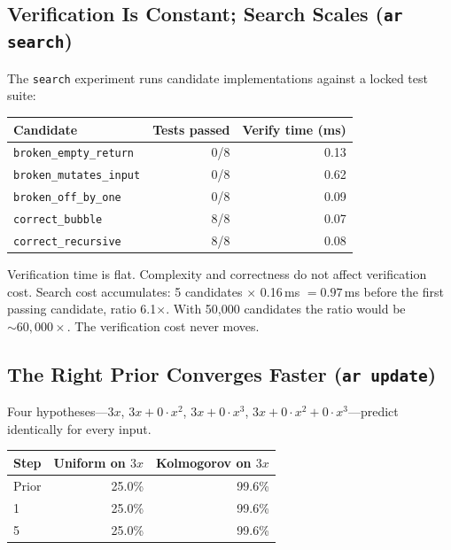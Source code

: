 \subsection{Verification Is Constant; Search Scales (\texttt{ar search})}

The \texttt{search} experiment runs candidate implementations against a
locked test suite:

\begin{center}
\begin{tabular}{lrr}
\toprule
Candidate & Tests passed & Verify time (ms) \\
\midrule
\texttt{broken\_empty\_return}  & 0/8 & 0.13 \\
\texttt{broken\_mutates\_input} & 0/8 & 0.62 \\
\texttt{broken\_off\_by\_one}   & 0/8 & 0.09 \\
\texttt{correct\_bubble}        & 8/8 & 0.07 \\
\texttt{correct\_recursive}     & 8/8 & 0.08 \\
\bottomrule
\end{tabular}
\end{center}

Verification time is flat. Complexity and correctness do not affect
verification cost. Search cost accumulates: 5 candidates $\times$
0.16\,ms $= 0.97$\,ms before the first passing candidate, ratio
6.1$\times$. With 50,000 candidates the ratio would be
${\sim}60{,}000\times$. The verification cost never moves.

\subsection{The Right Prior Converges Faster (\texttt{ar update})}

Four hypotheses---$3x$, $3x + 0{\cdot}x^2$, $3x + 0{\cdot}x^3$,
$3x + 0{\cdot}x^2 + 0{\cdot}x^3$---predict identically for every input.

\begin{center}
\begin{tabular}{lrr}
\toprule
Step & Uniform on $3x$ & Kolmogorov on $3x$ \\
\midrule
Prior & 25.0\% & 99.6\% \\
1     & 25.0\% & 99.6\% \\
5     & 25.0\% & 99.6\% \\
\bottomrule
\end{tabular}
\end{center}

